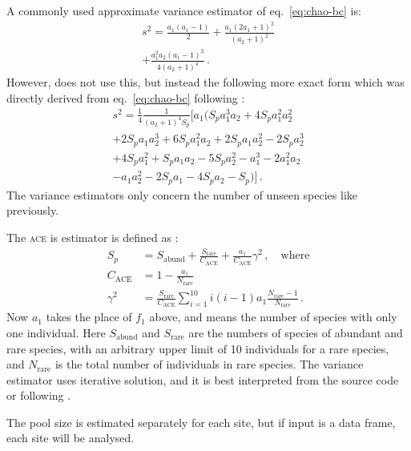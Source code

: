 \documentclass[a4paper,10pt,twocolumn]{article}
\begin{document}
A commonly used approximate variance estimator of eq.~\ref{eq:chao-bc} is:
\begin{multline}
  \label{eq:var-chao-bc}
 s^2 = \frac{a_1(a_1-1)}{2} + \frac{a_1(2 a_1+1)^2}{(a_2+1)^2}\\
  + \frac{a_1^2 a_2 (a_1 -1)^2}{4 (a_2 + 1)^4} \,.
\end{multline}
However,  does not use this, but instead the following more
exact form which was directly derived from eq.~\ref{eq:chao-bc}
following \citet[web appendix]{ChiuEtal14}:
\begin{multline}
  s^2 = \frac{1}{4} \frac{1}{(a_2+1)^4 S_p} [a_1 (S_p a_1^3
      a_2 + 4 S_p a_1^2 a_2^2 \\+  2 S_p a_1 a_2^3 + 6 S_p a_1^2 a_2 + 2 S_p
      a_1 a_2^2 -2 S_p a_2^3 \\+ 4 S_p a_1^2 + S_p a_1 a_2 -5 S_p a_2^2 - a_1^3 - 2
      a_1^2 a_2\\ - a_1 a_2^2 - 2 S_p a_1 - 4 S_p a_2 - S_p ) ]\,.
\end{multline}
The variance estimators only concern the number of unseen species like previously.

The \textsc{ace} is estimator is defined as \citep{OHara05}:
\begin{equation}
\begin{split}
S_p &= S_\mathrm{abund} + \frac{S_\mathrm{rare}}{C_\mathrm{ACE}} +
\frac{a_1}{C_\mathrm{ACE}} \gamma^2\, , \quad \text{where}\\
C_\mathrm{ACE} &= 1 - \frac{a_1}{N_\mathrm{rare}}\\
\gamma^2 &= \frac{S_\mathrm{rare}}{C_\mathrm{ACE}} \sum_{i=1}^{10} i
(i-1) a_1 \frac{N_\mathrm{rare} - 1}{N_\mathrm{rare}}\,.
\end{split}
\end{equation}
Now $a_1$ takes the place of $f_1$ above, and means the number of
species with only one individual.
Here $S_\mathrm{abund}$ and $S_\mathrm{rare}$ are the numbers of
species of abundant and rare species, with an arbitrary upper limit of
10 individuals for a rare species, and $N_\mathrm{rare}$ is the total
number of individuals in rare species. The variance estimator uses
iterative solution, and it is best interpreted from the source code or
following \citet{OHara05}.

The pool size
is estimated separately for each site, but if input is a data frame,
each site will be analysed.
\end{document}

